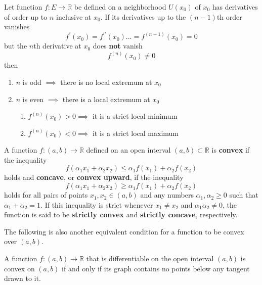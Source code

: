   \begin{theorem}
    Let function $f: E \longrightarrow \mathbb{R}$ be defined on a neighborhood $U(x_0)$ of $x_0$ has derivatives of order up to $n$ inclusive at $x_0$. If its derivatives up to the $(n-1)$th order vanishes 
    \[f^\prime (x_0) = f^{\prime\prime} (x_0) ... = f^{(n-1)} (x_0) = 0\]
    but the $n$th derivative at $x_0$ does \textbf{not} vanish
    \[f^{(n)} (x_0) \neq 0\]
    then 
    \begin{enumerate}
      \item $n$ is odd $\implies$ there is no local extremum at $x_0$ 
      \item $n$ is even $\implies$ there is a local extremum at $x_0$
      \begin{enumerate}
        \item $f^{(n)} (x_0) > 0 \implies$ it is a strict local minimum
        \item $f^{(n)} (x_0) < 0 \implies$ it is a strict local maximum
      \end{enumerate}
    \end{enumerate}
  \end{theorem}

  \begin{definition}
    A function $f: (a, b) \longrightarrow \mathbb{R}$ defined on an open interval $(a, b) \subset \mathbb{R}$ is \textbf{convex} if the inequality
    \[f( \alpha_1 x_1 + \alpha_2 x_2) \leq \alpha_1 f(x_1) + \alpha_2 f(x_2)\]
    holds and \textbf{concave}, or \textbf{convex upward}, if the inequality 
    \[f( \alpha_1 x_1 + \alpha_2 x_2) \geq \alpha_1 f(x_1) + \alpha_2 f(x_2)\]
    holds for all pairs of points $x_1, x_2 \in (a, b)$ and any numbers $\alpha_1, \alpha_2 \geq 0$ such that $\alpha_1 + \alpha_2 = 1$. If this inequality is strict whenever $x_1 \neq x_2$ and $\alpha_1 \alpha_2 \neq 0$, the function is said to be \textbf{strictly convex} and \textbf{strictly concave}, respectively. 
  \end{definition}

  The following is also another equivalent condition for a function to be convex over $(a, b)$. 

  \begin{theorem}
    A function $f: (a, b) \longrightarrow \mathbb{R}$ that is differentiable on the open interval $(a, b)$ is convex on $(a, b)$ if and only if its graph contains no points below any tangent drawn to it.
  \end{theorem}

